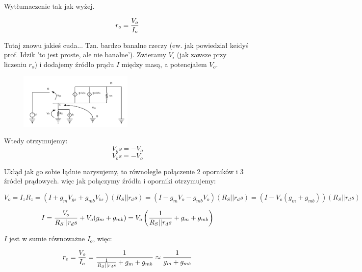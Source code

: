 \documentclass[10pt,a4paper]{article}
\begin{document}
Wytłumaczenie tak jak wyżej. 

\begin{equation}
r_o = {V_o \over I_o}
\end{equation}

Tutaj znowu jakieś cuda... Tzn. bardzo banalne rzeczy (ew. jak powiedział keidyś prof. Idzik 'to jest proste, ale nie banalne'). Zwieramy $V_i$ (jak zawsze przy liczeniu $r_o$) i dodajemy źródło prądu $I$ między masą, a potencjałem $V_o$.

\begin{figure}[H]
\centering
\includegraphics[width=0.5\textwidth]{CD2}
\end{figure}

Wtedy otrzymujemy:
\begin{equation}
V_gs = - V_o
\end{equation}
\begin{equation}
V_bs = - V_o
\end{equation}

Ukłąd jak go sobie łądnie narysujemy, to równoległe połączenie 2 oporników i 3 źródeł prądowych. więc jak połączymy źródła i oporniki otrzymujemy:

\begin{equation}
V_o = {I_z R_z} = (I + g_mV_{gs} + g_{mb}V_{bs})(R_S || r_ds) = (I - g_mV_o - g_{mb}V_o)(R_S || r_ds) = (I - V_o(g_m + g_{mb}))(R_S || r_ds)
\end{equation}

\begin{equation}
I = {V_o \over R_S || r_ds} + V_o(g_m + g_{mb}) = V_o\left({1 \over R_S || r_ds} + g_m + g_{mb}\right)
\end{equation}

$I$ jest w sumie równoważne $I_o$, więc:

\begin{equation}
r_o = {V_o \over I_o} = {1 \over{1 \over R_S || r_ds} + g_m + g_{mb}} \approx {1 \over g_m + g_{mb}}
\end{equation}
\end{document}
